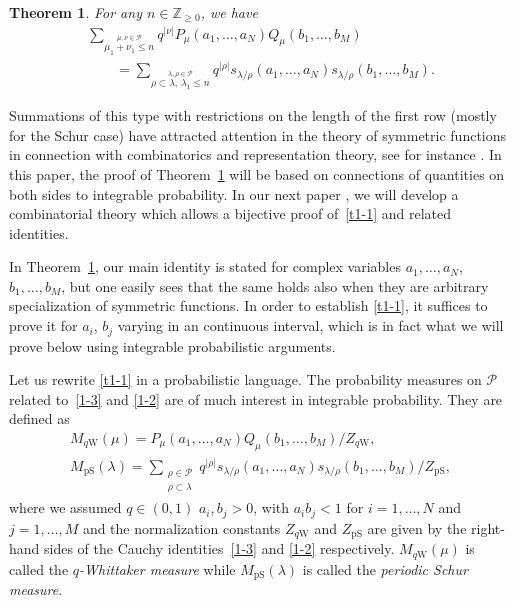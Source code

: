 \documentclass[11pt]{article}
\numberwithin{equation}{section}
\numberwithin{equation}{section}
\newtheorem{Theorem}{Theorem}[section]
\def\l{\lambda}
\def\Pe{\mathcal{P}}
\def\Z{\mathbb{Z}}
\begin{document}
 \begin{Theorem} \label{t1}
 For any $n\in\Z_{\ge 0}$, we have
 \begin{gather}
 \sum_{\stackrel{\mu,\nu\in\Pe}{\mu_1+\nu_1\le n}}q^{|\nu|}P_{\mu}(a_1,\dots,a_N)
 Q_{\mu}(b_1,\dots,b_M)\nonumber\\
 \qquad=
 \sum_{\stackrel{\l,\rho\in\Pe}{\rho\subset\l,\,\l_1\le n}}
 q^{|\rho|}s_{\l/\rho}(a_1,\dots,a_N)s_{\l/\rho}(b_1,\dots,b_M). \label{t1-1}
 \end{gather}
 \end{Theorem}
 Summations of this type with restrictions on the length of the first row (mostly for the Schur case) have attracted attention in the theory of symmetric functions in connection with combinatorics and representation theory, see for instance \cite{Baik-Rains2001algebraic,Gessel1990Cauchysum,Rains1998IncreasingSubsequence,Rains-Warnaar2015boundedLittlewoodidentities}.
 In this paper, the proof of Theorem~\ref{t1} will be based on connections of quantities on both sides to integrable probability. In our next paper \cite{ImamuraMucciconiSasamoto2021skewRSK}, we will develop a combinatorial theory which allows a bijective proof of~\eqref{t1-1} and related identities.

 \begin{Remark} \label{rem:intro}
 In Theorem~\ref{t1}, our main identity is stated for complex variables $a_1,\dots,a_N$, $b_1,\dots,b_M$, but one easily sees that the same holds also when they are arbitrary specialization of symmetric functions. In order to establish \eqref{t1-1}, it suffices to prove it for $a_i$, $b_j$ varying in an continuous interval, which is in fact what we will prove below using integrable probabilistic arguments.
 \end{Remark}

 Let us rewrite \eqref{t1-1} in a probabilistic language. The probability measures on $\Pe$ related to~\eqref{1-3} and \eqref{1-2} are of much interest in integrable probability.
 They are defined as
 \begin{gather}
 M_{q\text{W}}(\mu)=P_{\mu}(a_1,\dots,a_N)Q_{\mu}(b_1,\dots,b_M)/Z_{q\text{W}}, \label{s13}
 \\
 M_{\text{pS}}(\l)=
 \sum_{\substack{\rho\in\Pe\\ \rho \subset\l }}q^{|\rho|}s_{\l/\rho}(a_1,\dots,a_N)s_{\l/\rho}(b_1,\dots,b_M)/Z_{\text{pS}}, \label{1-8}
 \end{gather}
 where we assumed $q \in (0,1)$ $a_i,b_j>0$, with $a_ib_j<1$ for $i=1,\dots,N$ and $j=1,\dots,M$ and the normalization constants $Z_{q\text{W}}$ and $Z_{\text{pS}}$ are given by the right-hand sides of the Cauchy identities~\eqref{1-3} and \eqref{1-2} respectively.
 $M_{q\text{W}}(\mu)$ is called the \emph{$q$-Whittaker measure}
 while $M_{\text{pS}}(\l)$ is called the \emph{periodic Schur measure}.
\end{document}
